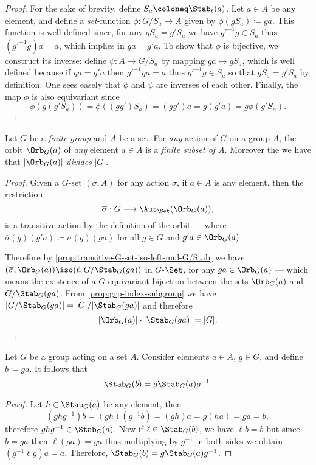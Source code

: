 \begin{proof}
For the sake of brevity, define \(S_a \coloneq \Stab_{\ell}(a)\). Let
\(a \in A\) be any element, and define a \emph{set}-function
\(\phi: G/S_a \to A\) given by \(\phi(g S_a) \coloneq g a\). This function is
well defined since, for any \(g S_a = g' S_a\) we have \(g'^{-1} g \in S_a\)
thus \((g'^{-1} g) a = a\), which implies in \(g a = g' a\). To show that
\(\phi\) is bijective, we construct its inverse: define \(\psi: A \to G/S_a\) by
mapping \(g a \mapsto g S_a\), which is well defined because if \(g a = g' a\)
then \(g'^{-1} g a = a\) thus \(g'^{-1} g \in S_a\) so that \(g S_a = g' S_a\)
by definition. One sees easely that \(\phi\) and \(\psi\) are inverses of each
other. Finally, the map \(\phi\) is also equivariant since
\[
\phi(g(g' S_a)) = \phi((g g') S_a) = (g g') a = g(g'a) = g \phi(g' S_a).
\]
\end{proof}

\begin{corollary}
\label{cor:orbit-divides-order-of-group}
Let \(G\) be a \emph{finite group} and \(A\) be a set. For \emph{any} action of
\(G\) on a group \(A\), the orbit \(\Orb_G(a)\) of \emph{any} element
\(a \in A\) is a \emph{finite subset of \(A\)}. Moreover the we have that
\(|\Orb_G(a)|\) \emph{divides} \(|G|\).
\end{corollary}

\begin{proof}
Given a \(G\)-set \((\sigma, A)\) for any action \(\sigma\), if \(a \in A\) is
any element, then the restriction
\[
\overline{\sigma}: G \longrightarrow \Aut_{\Set}(\Orb_G(a)),
\]
is a transitive action by the definition of the orbit --- where
\(\overline{\sigma}(g)(g' a) \coloneq \sigma(g)(g a)\) for all \(g \in G\) and
\(g' a \in \Orb_G(a)\).

Therefore by \cref{prop:transitive-G-set-iso-left-mul-G/Stab} we have
\((\overline{\sigma}, \Orb_G(a)) \iso (\ell, G/\Stab_G(g a))\) in
\(G\)-\(\Set\), for any \(g a \in \Orb_G(a)\) --- which means the existence of a
\(G\)-equivariant bijection between the sets \(\Orb_G(a)\) and
\(G/\Stab_G(g a)\). From \cref{prop:grp-index-subgroup} we have
\(|G/\Stab_G(g a)| = |G|/|\Stab_G(g a)|\) and therefore
\[
|\Orb_G(a)| \cdot |\Stab_G(g a)| = |G|.
\]
\end{proof}

\begin{theorem}
\label{thm:stabilizers-conjugation}
Let \(G\) be a group acting on a set \(A\). Consider elements \(a \in A\),
\(g \in G\), and define \(b \coloneq g a\). It follows that
\[
\Stab_G(b) = g \Stab_G(a) g^{-1}.
\]
\end{theorem}

\begin{proof}
Let \(h \in \Stab_G(a)\) be any element, then
\[
(g h g^{-1}) b = (g h) (g^{-1} b) = (g h) a = g (h a) = g a = b,
\]
therefore \(g h g^{-1} \in \Stab_G(a)\). Now if \(\ell \in \Stab_G(b)\), we have
\(\ell b = b\) but since \(b = g a\) then \(\ell (g a) = g a\) thus multiplying
by \(g^{-1}\) in both sides we obtain \((g^{-1} \ell g) a = a\). Therefore,
\(\Stab_G(b) = g \Stab_G(a) g^{-1}\).
\end{proof}

